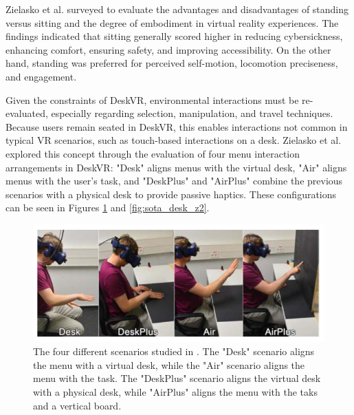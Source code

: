     Zielasko et al. \cite{zielaskoSitNotSit2021} surveyed to evaluate the advantages and disadvantages of standing versus sitting and the degree of embodiment in virtual reality experiences. The findings indicated that sitting generally scored higher in reducing cybersickness, enhancing comfort, ensuring safety, and improving accessibility. On the other hand, standing was preferred for perceived self-motion, locomotion preciseness, and engagement.

    Given the constraints of DeskVR, environmental interactions must be re-evaluated, especially regarding selection, manipulation, and travel techniques. Because users remain seated in DeskVR, this enables interactions not common in typical VR scenarios, such as touch-based interactions on a desk. Zielasko et al. \cite{zielaskoMenusDeskSystem2019} explored this concept through the evaluation of four menu interaction arrangements in DeskVR: "Desk" aligns menus with the virtual desk, "Air" aligns menus with the user's task, and "DeskPlus" and "AirPlus" combine the previous scenarios with a physical desk to provide passive haptics. These configurations can be seen in Figures \ref{fig:sota_desk_z} and \ref{fig:sota_desk_z2}.
    
    \begin{figure}[h!]
        \centering
        \includegraphics[width=0.85\linewidth]{figures/menu_desk.png}
        \caption{The four different scenarios studied in \cite{zielaskoMenusDeskSystem2019}. The "Desk" scenario aligns the menu with a virtual desk, while the "Air" scenario aligns the menu with the task. The "DeskPlus" scenario aligns the virtual desk with a physical desk, while "AirPlus" aligns the menu with the taks and a vertical board.  }
        \label{fig:sota_desk_z}
    \end{figure}


